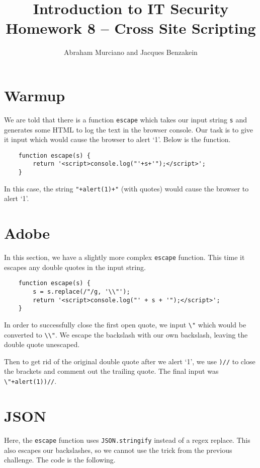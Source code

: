 \documentclass{article}
\title{Introduction to IT Security\\
\medskip
\large Homework 8 -- Cross Site Scripting}
\author{Abraham Murciano and Jacques Benzakein}
\begin{document}
\maketitle

\section{Warmup}

We are told that there is a function \verb`escape` which takes our input string \verb`s` and generates some HTML to log the text in the browser console. Our task is to give it input which would cause the browser to alert `1'. Below is the function.

\begin{verbatim}
	function escape(s) {
	    return '<script>console.log("'+s+'");</script>';
	}
\end{verbatim}

In this case, the string \verb`"+alert(1)+"` (with quotes) would cause the browser to alert `1'.

\section{Adobe}

In this section, we have a slightly more complex \verb`escape` function. This time it escapes any double quotes in the input string.

\begin{verbatim}
	function escape(s) {
	    s = s.replace(/"/g, '\\"');
	    return '<script>console.log("' + s + '");</script>';
	}
\end{verbatim}

In order to successfully close the first open quote, we input \verb`\"` which would be converted to \verb`\\"`. We escape the backslash with our own backslash, leaving the double quote unescaped.

Then to get rid of the original double quote after we alert `1', we use \verb`)//` to close the brackets and comment out the trailing quote. The final input was \verb`\"+alert(1))//`.

\section{JSON}

Here, the \verb`escape` function uses \verb`JSON.stringify` instead of a regex replace. This also escapes our backslashes, so we cannot use the trick from the previous challenge. The code is the following.
\end{document}
